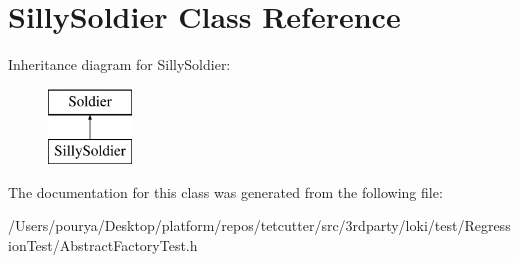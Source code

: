 \hypertarget{classSillySoldier}{}\section{Silly\+Soldier Class Reference}
\label{classSillySoldier}
Inheritance diagram for Silly\+Soldier\+:\begin{figure}[H]
\begin{center}
\leavevmode
\includegraphics[height=2.000000cm]{classSillySoldier}
\end{center}
\end{figure}


The documentation for this class was generated from the following file\+:\begin{DoxyCompactItemize}
\item 
/\+Users/pourya/\+Desktop/platform/repos/tetcutter/src/3rdparty/loki/test/\+Regression\+Test/Abstract\+Factory\+Test.\+h\end{DoxyCompactItemize}
